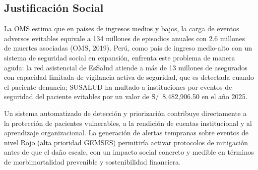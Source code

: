 \subsection{Justificación Social}
\label{subsec:justif_social}

La OMS estima que en países de ingresos medios y bajos, la carga de eventos adversos evitables equivale a 134 millones de episodios anuales con 2.6 millones de muertes asociadas (OMS, 2019). Perú, como país de ingreso medio-alto con un sistema de seguridad social en expansión, enfrenta este problema de manera aguda: la red asistencial de EsSalud atiende a más de 13 millones de asegurados con capacidad limitada de vigilancia activa de seguridad, que es detectada cuando el paciente denuncia; SUSALUD ha multado a instituciones por eventos de seguridad del paciente evitables por un valor de S/~8{,}482{,}906.50 en el año 2025.

Un sistema automatizado de detección y priorización contribuye directamente a la protección de pacientes vulnerables, a la rendición de cuentas institucional y al aprendizaje organizacional. La generación de alertas tempranas sobre eventos de nivel Rojo (alta prioridad GEMSES) permitiría activar protocolos de mitigación antes de que el daño escale, con un impacto social concreto y medible en términos de morbimortalidad prevenible y sostenibilidad financiera.
